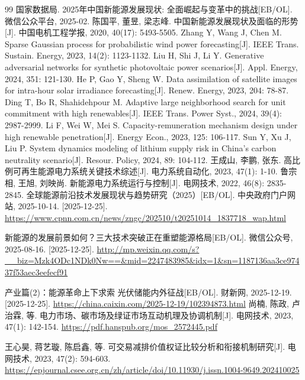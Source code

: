 \documentclass[a4paper,11pt,AutoFakeBold]{article}
\begin{document}
\begin{thebibliography}{99}
   国家数据局. 2025年中国新能源发展现状: 全面崛起与变革中的挑战[EB/OL]. 微信公众平台, 2025-02.
   陈国平, 董昱, 梁志峰. 中国新能源发展现状及面临的形势[J]. 中国电机工程学报, 2020, 40(17): 5493-5505.
   Zhang Y, Wang J, Chen M. Sparse Gaussian process for probabilistic wind power forecasting[J]. IEEE Trans. Sustain. Energy, 2023, 14(2): 1123-1132.
   Liu H, Shi J, Li Y. Generative adversarial networks for synthetic photovoltaic power scenarios[J]. Appl. Energy, 2024, 351: 121-130.
   He P, Gao Y, Sheng W. Data assimilation of satellite images for intra-hour solar irradiance forecasting[J]. Renew. Energy, 2023, 204: 78-87.
   Ding T, Bo R, Shahidehpour M. Adaptive large neighborhood search for unit commitment with high renewables[J]. IEEE Trans. Power Syst., 2024, 39(4): 2987-2999.
   Li F, Wei W, Mei S. Capacity-remuneration mechanism design under high renewable penetration[J]. Energy Econ., 2023, 125: 106-117.
   Sun Y, Xu J, Liu P. System dynamics modeling of lithium supply risk in China’s carbon neutrality scenario[J]. Resour. Policy, 2024, 89: 104-112.
   王成山, 李鹏, 张东. 高比例可再生能源电力系统关键技术综述[J]. 电力系统自动化, 2023, 47(1): 1-10.
   鲁宗相, 王旭, 刘映尚. 新能源电力系统运行与控制[J]. 电网技术, 2022, 46(8): 2835-2845.
  全球能源前沿技术发展现状与趋势研究（2025）[EB/OL].
  中央政府门户网站, 2025-10-14.
  [2025-12-25].
  \url{https://www.cpnn.com.cn/news/zngc/202510/t20251014_1837718_wap.html}

  新能源的发展前景如何？三大技术突破正在重塑能源格局[EB/OL].
  微信公众号, 2025-08-16.
  [2025-12-25].
  \url{http://mp.weixin.qq.com/s?__biz=Mzk4ODc1NDk0Nw==&mid=2247483985&idx=1&sn=1187136aa3ce97437f53aec3eefecf91}

  产业篇(2)：能源革命上下求索 光伏储能内外征战[EB/OL].
  财新网, 2025-12-19.
  [2025-12-25].
  \url{https://china.caixin.com/2025-12-19/102394873.html}
  尚楠, 陈政, 卢治霖, 等. 电力市场、碳市场及绿证市场互动机理及协调机制[J]. 电网技术, 2023, 47(1): 142-154.
  \url{https://pdf.hanspub.org/mos_2572445.pdf}

  王心昊, 蒋艺璇, 陈启鑫, 等. 可交易减排价值权证比较分析和衔接机制研究[J]. 电网技术, 2023, 47(2): 594-603.
  \url{https://epjournal.csee.org.cn/zh/article/doi/10.11930/j.issn.1004-9649.202410025}


\end{thebibliography}
\end{document}
